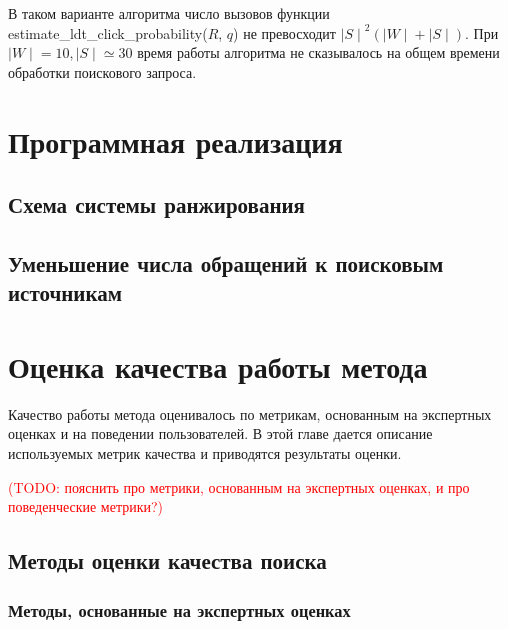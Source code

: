 \documentclass[12pt,a4paper]{report}
\newcommand\note[1]{\textcolor{red}{(#1)}}
\newcommand\todonote[1]{\note{TODO: #1}}
\newcommand*\card[1]{{\mid #1 \mid}}
\begin{document}
В таком варианте алгоритма число вызовов функции \linebreak \textrm{estimate\_ldt\_click\_probability($R$, $q$)} не превосходит $\card{S}^2 (\card{W} + \card{S})$. При $\card{W} = 10, \card{S} \simeq 30$ время работы алгоритма не сказывалось на общем времени обработки поискового запроса.


\chapter{Программная реализация}

\section{Схема системы ранжирования}


\section{Уменьшение числа обращений к поисковым источникам}

\chapter{Оценка качества работы метода}

Качество работы метода оценивалось по метрикам, основанным на экспертных оценках и на поведении пользователей. В этой главе дается описание используемых метрик качества и приводятся результаты оценки.

\todonote{пояснить про метрики, основанным на экспертных оценках, и про поведенческие метрики?}

\section{Методы оценки качества поиска}

\subsection{Методы, основанные на экспертных оценках}
\end{document}

